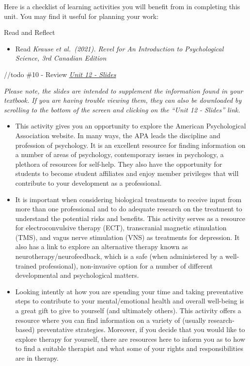 \documentclass[
]{book}
\providecommand{\tightlist}{%
  \setlength{\itemsep}{0pt}\setlength{\parskip}{0pt}}
\begin{document}
\begin{reflect}
Here is a checklist of learning activities you will benefit from in completing this unit. You may find it useful for planning your work:

{Read and Reflect}

\begin{itemize}
\tightlist
\item
  Read \emph{Krause et al.~(2021). Revel for An Introduction to Psychological Science, 3rd Canadian Edition}
\end{itemize}

//todo \#10
- Review \href{PSYC106-CH16Therapies3rdEd.pptx}{\emph{Unit 12 - Slides}}

\emph{Please note, the slides are intended to supplement the information found in your textbook. If you are having trouble viewing them, they can also be downloaded by scrolling to the bottom of the screen and clicking on the ``Unit 12 - Slides'' link.}

\begin{itemize}
\item
  This activity gives you an opportunity to explore the American Psychological Association website. In many ways, the APA leads the discipline and profession of psychology. It is an excellent resource for finding information on a number of areas of psychology, contemporary issues in psychology, a plethora of resources for self-help. They also have the opportunity for students to become student affiliates and enjoy member privileges that will contribute to your development as a professional.
\item
  It is important when considering biological treatments to receive input from more than one professional and to do adequate research on the treatment to understand the potential risks and benefits. This activity serves as a resource for electroconvulsive therapy (ECT), transcranial magnetic stimulation (TMS), and vagus nerve stimulation (VNS) as treatments for depression. It also has a link to explore an alternative therapy known as neurotherapy/neurofeedback, which is a safe (when administered by a well-trained professional), non-invasive option for a number of different developmental and psychological matters.
\item
  Looking intently at how you are spending your time and taking preventative steps to contribute to your mental/emotional health and overall well-being is a great gift to give to yourself (and ultimately others). This activity offers a resource where you can find information on a variety of (usually research-based) preventative strategies. Moreover, if you decide that you would like to explore therapy for yourself, there are resources here to inform you as to how to find a suitable therapist and what some of your rights and responsibilities are in therapy.
\end{itemize}


\end{reflect}
\end{document}
